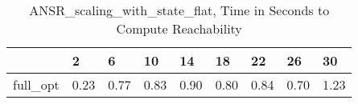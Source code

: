 \begin{table}
\caption{ANSR\_scaling\_with\_state\_flat, Time in Seconds to Compute Reachability}
\label{ANSR_scaling_with_state_flat_states_time}
\begin{tabular}{lllllllll}
\toprule
 & 2 & 6 & 10 & 14 & 18 & 22 & 26 & 30 \\
\midrule
full\_opt & 0.23 & 0.77 & 0.83 & 0.90 & 0.80 & 0.84 & 0.70 & 1.23 \\
\bottomrule
\end{tabular}
\end{table}
